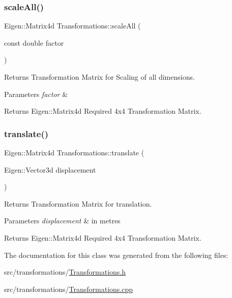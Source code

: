 \subsubsection{\texorpdfstring{scale\+All()}{scaleAll()}}
{\footnotesize\ttfamily Eigen\+::\+Matrix4d Transformations\+::scale\+All (\begin{DoxyParamCaption}\item[{const double}]{factor }\end{DoxyParamCaption})}



Returns Transformation Matrix for Scaling of all dimensions. 


\begin{DoxyParams}{Parameters}
{\em factor} & \\
\hline
\end{DoxyParams}
\begin{DoxyReturn}{Returns}
Eigen\+::\+Matrix4d Required 4x4 Transformation Matrix. 
\end{DoxyReturn}
\mbox{\label{classTransformations_a7b7212f21b4e71ea50526e8359d74929}} 
\subsubsection{\texorpdfstring{translate()}{translate()}}
{\footnotesize\ttfamily Eigen\+::\+Matrix4d Transformations\+::translate (\begin{DoxyParamCaption}\item[{Eigen\+::\+Vector3d}]{displacement }\end{DoxyParamCaption})}



Returns Transformation Matrix for translation. 


\begin{DoxyParams}{Parameters}
{\em displacement} & in metres \\
\hline
\end{DoxyParams}
\begin{DoxyReturn}{Returns}
Eigen\+::\+Matrix4d Required 4x4 Transformation Matrix. 
\end{DoxyReturn}


The documentation for this class was generated from the following files\+:\begin{DoxyCompactItemize}
\item 
src/transformations/\hyperlink{Transformations_8h}{Transformations.\+h}\item 
src/transformations/\hyperlink{Transformations_8cpp}{Transformations.\+cpp}\end{DoxyCompactItemize}
